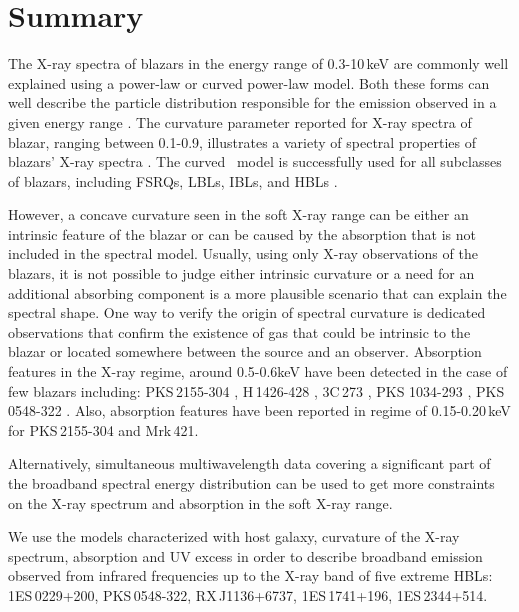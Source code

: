 \section{Summary} 
\label{summary}
The X-ray spectra of blazars in the energy range of 0.3-10\,keV are commonly well explained using a  power-law or curved power-law model. 
Both these forms can well describe the particle distribution responsible for the emission observed in a given energy range \citep[e.g.][]{Tramacere2007,  Massaro2008}. 
The curvature parameter reported for X-ray spectra of blazar, ranging between 0.1-0.9,  illustrates a variety of spectral properties of blazars'  X-ray spectra \citep [see, e.g.][]{Massaro2004, Tramacere2007, Wierzcholska2016}.
The curved \po\ model is successfully used for all subclasses of blazars, including FSRQs, LBLs, IBLs, and HBLs \citep[e.g.,][]{Wierzcholska2016}.

However, a concave curvature seen in the soft X-ray range can be either an intrinsic feature of the blazar or can be caused by the absorption that is not included in the spectral model.
Usually, using only X-ray observations of the blazars, it is not possible to judge either intrinsic curvature or a  need for an additional absorbing component is a more plausible scenario that can explain the spectral shape. 
One way to verify the origin of spectral curvature is dedicated observations that confirm the existence of gas that could be intrinsic to the blazar or located somewhere between the source and an observer.
Absorption features in the X-ray regime, around 0.5-0.6keV  have been detected in the case of few blazars including: PKS\,2155-304 \citep{Canizares_2155, Madejski_2155}, H\,1426-428 \citep{Sambruna_1426}, 3C\,273 \citep{Grandi_273}, PKS 1034-293 \citep{Sambruna}, PKS\,0548-322 \cite{Sambruna_1998}.
Also, absorption features have been reported in regime of 0.15-0.20\,keV for PKS\,2155-304 \citep{Koenigl_2155} and Mrk\,421\cite{Kartje_421}.

Alternatively, simultaneous multiwavelength data covering a significant part of the broadband spectral energy distribution can be used to get more constraints on the X-ray spectrum and absorption in the soft X-ray range. 


We use the models characterized with host galaxy, curvature of the X-ray spectrum, absorption and UV excess in order to describe broadband emission observed from infrared frequencies up to the X-ray band of five extreme HBLs: 1ES\,0229+200, PKS\,0548-322, RX\,J1136+6737, 1ES\,1741+196, 1ES\,2344+514.


